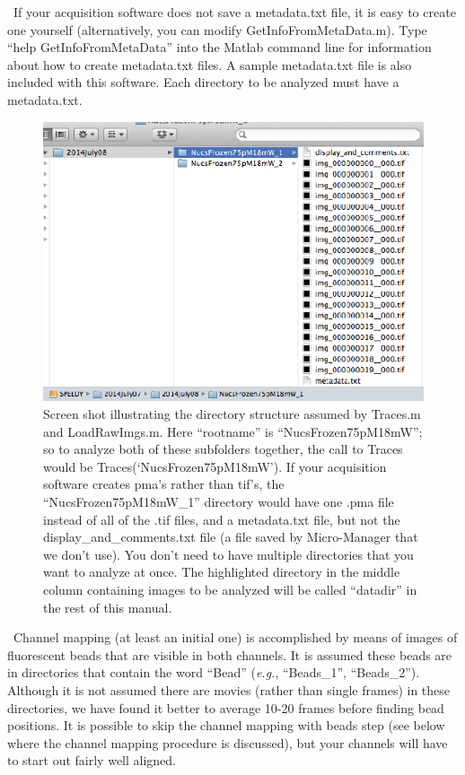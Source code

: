 \documentclass[11pt]{article}
\begin{document}
\noindent \textbullet~If your acquisition software does not save a metadata.txt file, it is easy to create one yourself (alternatively, you can modify GetInfoFromMetaData.m). Type ``help GetInfoFromMetaData'' into the Matlab command line for information about how to create metadata.txt files.  A sample metadata.txt file is also included with this software.  Each directory to be analyzed must have a metadata.txt.\\ 


\begin{figure}[!t]
\begin{center}
\includegraphics[width=4.5in]{ScreenShots/DirectoriesShot.eps}
\caption{Screen shot illustrating the directory structure assumed by Traces.m and LoadRawImgs.m.  Here ``rootname'' is ``NucsFrozen75pM18mW''; so to analyze both of these subfolders together, the call to Traces would be Traces(`NucsFrozen75pM18mW').  If your acquisition software creates pma's rather than tif's, the ``NucsFrozen75pM18mW\_1'' directory would have one .pma file instead of all of the .tif files, and a metadata.txt file, but not the display\_and\_comments.txt file (a file saved by Micro-Manager that we don't use).  You don't need to have multiple directories that you want to analyze at once. The highlighted directory in the middle column containing images to be analyzed will be called ``datadir'' in the rest of this manual.}
\label{fig:DirectoryStructure}
\end{center}
\end{figure}

\noindent \textbullet~Channel mapping (at least an initial one) is accomplished by means of images of fluorescent beads that are visible in both channels. It is assumed these beads are in directories that contain the word ``Bead'' ({\it e.g.}, ``Beads\_1'', ``Beads\_2''). Although it is not assumed there are movies (rather than single frames) in these directories, we have found it better to average 10-20 frames before finding bead positions.  It is possible to skip the channel mapping with beads step (see below where the channel mapping procedure is discussed), but your channels will have to start out fairly well aligned.\\
\end{document}
